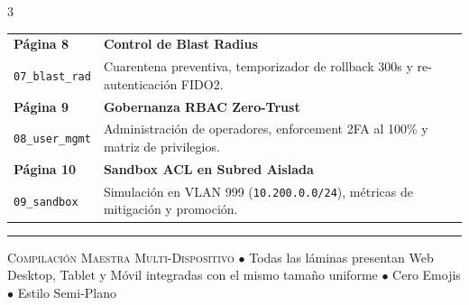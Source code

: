 \documentclass[11pt]{article}
\begin{document}
\begin{multicols}{3}
\begin{tabularx}{\linewidth}{lX}
\midrule
\textbf{\color{textprimary}Página 8} & \textbf{\color{textprimary}Control de Blast Radius}\\[-1bp]
\texttt{07\_blast\_rad} & Cuarentena preventiva, temporizador de rollback 300s y re-autenticación FIDO2. \\
\midrule
\textbf{\color{textprimary}Página 9} & \textbf{\color{textprimary}Gobernanza RBAC Zero-Trust}\\[-1bp]
\texttt{08\_user\_mgmt} & Administración de operadores, enforcement 2FA al 100\% y matriz de privilegios. \\
\midrule
\textbf{\color{textprimary}Página 10} & \textbf{\color{textprimary}Sandbox ACL en Subred Aislada}\\[-1bp]
\texttt{09\_sandbox} & Simulación en VLAN 999 (\texttt{10.200.0.0/24}), métricas de mitigación y promoción. \\
\bottomrule
\end{tabularx}

\end{multicols}

\vspace{6bp}
\noindent\textcolor{border}{\rule{\textwidth}{0.8bp}}
\vspace{2bp}
\begin{center}
    {\footnotesize\color{textmuted}\textsc{Compilación Maestra Multi-Dispositivo} \quad $\bullet$ \quad Todas las láminas presentan Web Desktop, Tablet y Móvil integradas con el mismo tamaño uniforme \quad $\bullet$ \quad Cero Emojis $\bullet$ Estilo Semi-Plano}
\end{center}
\end{document}
